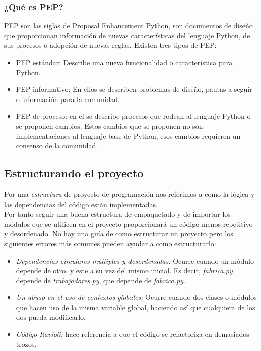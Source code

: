 \subsubsection*{¿Qué es PEP?}
PEP son las siglas de Proposal Enhancement Python, son documentos de diseño que proporcionan información de nuevas características del lenguaje Python, de sus procesos o adopción de nuevas reglas. Existen tres tipos de PEP:
\begin{itemize}
    \item PEP estándar: Describe una nueva funcionalidad o característica para Python. 
    \item PEP informativo: En ellos se describen problemas de diseño, pautas a seguir o información para la comunidad.
    \item PEP de proceso: en el se describe procesos que rodean al lenguaje Python o se proponen cambios. Estos cambios que se proponen no son implementaciones al lenguaje base de Python, esos cambios requieren un consenso de la comunidad. 
\end{itemize}

\subsection*{Estructurando el proyecto}
\label{subsec:structurePython}
Por una \emph{estructura} de proyecto de programación nos referimos a como la lógica y las dependencias del código están implementadas. \\
Por tanto seguir una buena estructura de empaquetado y de importar los módulos que se utilicen en el proyecto proporcionará un código menos repetitivo y desordenado. No hay una guía de como estructurar un proyecto pero los siguientes errores más comunes pueden ayudar a  como estructurarlo:
\begin{itemize}
    \item \textit{Dependencias circulares múltiples y desordenadas:} Ocurre cuando un módulo depende de otro, y este a su vez del mismo inicial. Es decir, \textit{fabrica.py} depende de \textit{trabajadores.py}, que depende de \textit{fabrica.py}.
    \item \textit{Un abuso en el uso de contextos globales:} Ocurre cuando dos clases o módulos que hacen uso de la misma variable global, haciendo así que cualquiera de los dos pueda modificarlo.
    \item \textit{Código Ravioli:} hace referencia a que el código se refactoriza en demasiados trozos.
\end{itemize}

